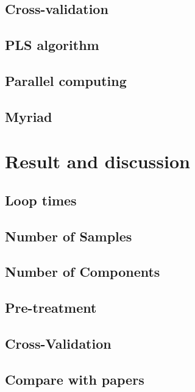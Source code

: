 \documentclass[a4paper,12pt,titlepage]{article} %
\numberwithin{equation}{section}  %
\begin{document}
	\subsection{Cross-validation}
	\label{cross-validation}
	
	\subsection{PLS algorithm}
	\label{PLS_al}
	
	\subsection{Parallel computing}
	\label{parallel}
	
	\subsection{Myriad}
	\label{myriad}
	
	
	\section{Result and discussion}
	\label{sec:result}
	
	\subsection{Loop times}
	
	\subsection{Number of Samples}
	
	\subsection{Number of Components}
	
	\subsection{Pre-treatment}
	
	\subsection{Cross-Validation}
	
	\subsection{Compare with papers}
	
\end{document}
